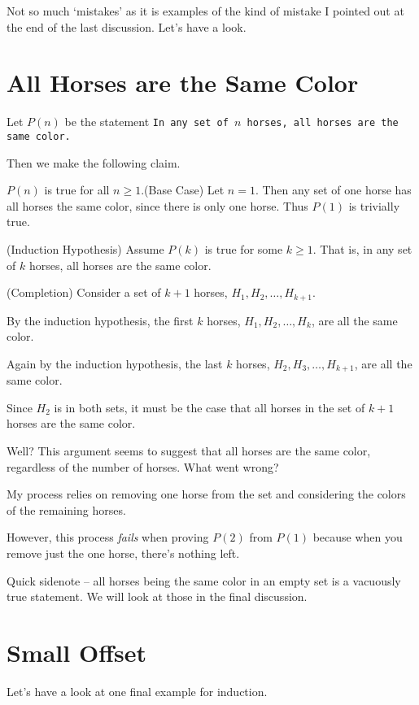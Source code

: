  

Not so much `mistakes' as it is examples of the kind of mistake I pointed out at the end of the last discussion. Let's have a look.

\section*{All Horses are the Same Color}
Let $P(n)$ be the statement \texttt{In any set of $n$ horses, all horses are the same color.}

Then we make the following claim.
\begin{SWP}{\asn}{$P(n)$ is true for all $n \geq 1$.}(Base Case) Let $n = 1$. Then any set of one horse has all horses the same color, since there is only one horse. Thus $P(1)$ is trivially true.

(Induction Hypothesis) Assume $P(k)$ is true for some $k \geq 1$. That is, in any set of $k$ horses, all horses are the same color.

(Completion) Consider a set of $k + 1$ horses, $H_1, H_2, \ldots, H_{k+1}$.

By the induction hypothesis, the first $k$ horses, $H_1, H_2, \ldots, H_k$, are all the same color.

Again by the induction hypothesis, the last $k$ horses, $H_2, H_3, \ldots, H_{k+1}$, are all the same color.

Since $H_2$ is in both sets, it must be the case that all horses in the set of $k + 1$ horses are the same color.
\end{SWP}
Well? This argument seems to suggest that all horses are the same color, regardless of the number of horses. What went wrong?

My process relies on removing one horse from the set and considering the colors of the remaining horses.

However, this process \textit{fails} when proving $P(2)$ from $P(1)$ because when you remove just the one horse, there's nothing left.

\begin{footnotesize}{Quick sidenote -- all horses being the same color in an empty set is a vacuously true statement. We will look at those in the final discussion.}
\end{footnotesize}
\section*{Small Offset}
Let's have a look at one final example for induction.

